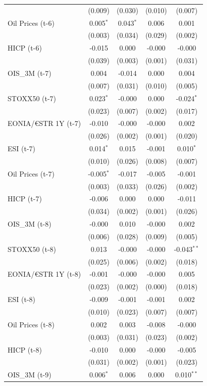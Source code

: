 \begin{longtable}[t]{lcccc}
 & (0.009) & (0.030) & (0.010) & (0.007)\\
Oil Prices (t-6) & 0.005$^{*}$ & 0.043$^{*}$ & 0.006 & 0.001\\
 & (0.003) & (0.034) & (0.029) & (0.002)\\
HICP (t-6) & -0.015 & 0.000 & -0.000 & -0.000\\
 & (0.039) & (0.003) & (0.001) & (0.031)\\
OIS\_3M (t-7) & 0.004 & -0.014 & 0.000 & 0.004\\
 & (0.007) & (0.031) & (0.010) & (0.005)\\
STOXX50 (t-7) & 0.023$^{*}$ & -0.000 & 0.000 & -0.024$^{*}$\\
 & (0.023) & (0.007) & (0.002) & (0.017)\\
EONIA/€STR 1Y (t-7) & -0.010 & -0.000 & -0.000 & 0.002\\
 & (0.026) & (0.002) & (0.001) & (0.020)\\
ESI (t-7) & 0.014$^{*}$ & 0.015 & -0.001 & 0.010$^{*}$\\
 & (0.010) & (0.026) & (0.008) & (0.007)\\
Oil Prices (t-7) & -0.005$^{*}$ & -0.017 & -0.005 & -0.001\\
 & (0.003) & (0.033) & (0.026) & (0.002)\\
HICP (t-7) & -0.006 & 0.000 & 0.000 & -0.011\\
 & (0.034) & (0.002) & (0.001) & (0.026)\\
OIS\_3M (t-8) & -0.000 & 0.010 & -0.000 & 0.002\\
 & (0.006) & (0.028) & (0.009) & (0.005)\\
STOXX50 (t-8) & 0.013 & -0.000 & -0.000 & -0.043$^{**}$\\
 & (0.025) & (0.006) & (0.002) & (0.018)\\
EONIA/€STR 1Y (t-8) & -0.001 & -0.000 & -0.000 & 0.005\\
 & (0.023) & (0.002) & (0.000) & (0.018)\\
ESI (t-8) & -0.009 & -0.001 & -0.001 & 0.002\\
 & (0.010) & (0.023) & (0.007) & (0.007)\\
Oil Prices (t-8) & 0.002 & 0.003 & -0.008 & -0.000\\
 & (0.003) & (0.031) & (0.023) & (0.002)\\
HICP (t-8) & -0.010 & 0.000 & -0.000 & -0.005\\
 & (0.031) & (0.002) & (0.001) & (0.023)\\
OIS\_3M (t-9) & 0.006$^{*}$ & 0.006 & 0.000 & 0.010$^{**}$\\

\end{longtable}
